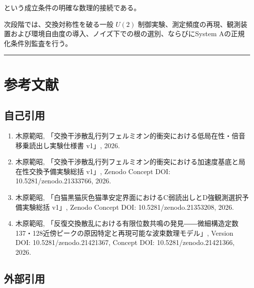 \documentclass[
  a4paper,
  10pt]{article}
\providecommand{\tightlist}{%
  \setlength{\itemsep}{0pt}\setlength{\parskip}{0pt}}
\begin{document}
という成立条件の明確な数理的接続である。

次段階では、交換対称性を破る一般 \(U(2)\)
制御実験、測定頻度の再現、観測装置および環境自由度の導入、ノイズ下での根の選別、ならびにSystem
Aの正規化条件別監査を行う。

\begin{center}\rule{0.5\linewidth}{0.5pt}\end{center}

\section{参考文献}\label{ux53c2ux8003ux6587ux732e}

\subsection{自己引用}\label{ux81eaux5df1ux5f15ux7528}

\begin{enumerate}
\def\labelenumi{\arabic{enumi}.}
\tightlist
\item
  木原範昭,
  「交換干渉散乱行列フェルミオン的衝突における低局在性・倍音移乗読出し実験仕様書
  v1」, 2026.
\item
  木原範昭,
  「交換干渉散乱行列フェルミオン的衝突における加速度基底と局在性交換予備実験総括
  v1」, Zenodo Concept DOI: 10.5281/zenodo.21333766, 2026.
\item
  木原範昭,
  「白猫黒猫灰色猫準安定界面におけるC弱読出しとD強観測選択予備実験総括
  v1」, Zenodo Concept DOI: 10.5281/zenodo.21353208, 2026.
\item
  木原範昭,
  「反復交換散乱における有限位数共鳴の発見――微細構造定数137・128近傍ピークの原因特定と再現可能な波束数理モデル」,
  Version DOI: 10.5281/zenodo.21421367, Concept DOI:
  10.5281/zenodo.21421366, 2026.
\end{enumerate}

\subsection{外部引用}\label{ux5916ux90e8ux5f15ux7528}
\end{document}
